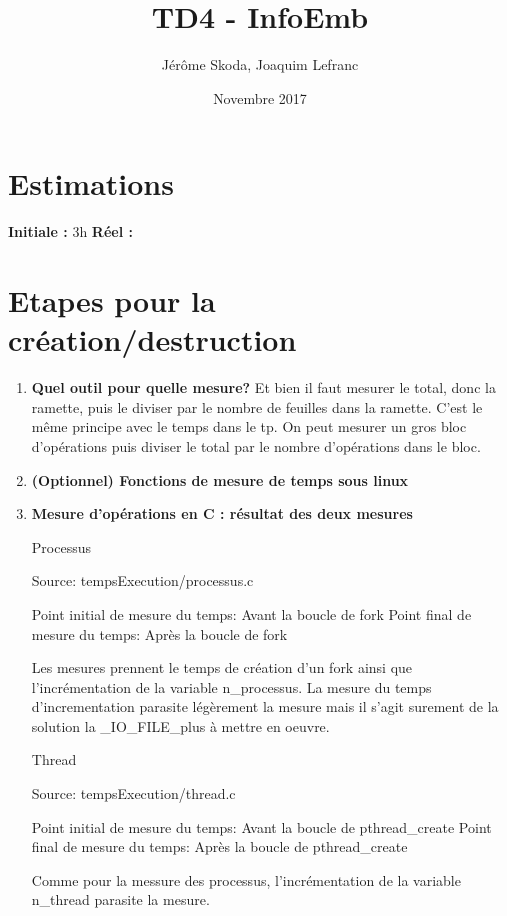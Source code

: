 \documentclass[12pt]{article}
\title{TD4 - InfoEmb}
\author{Jérôme Skoda, Joaquim Lefranc}
\date{Novembre 2017}
\begin{document}
\maketitle

\section{Estimations}
\textbf{Initiale :} 3h
\textbf{Réel :}

\section{Etapes pour la création/destruction}
\begin{enumerate}
	\item{\textbf{Quel outil pour quelle mesure?}}
		\newline
		Et bien il faut mesurer le total, donc la ramette, puis le diviser par le nombre de feuilles dans la ramette. C'est le même principe avec le temps dans le tp. On peut mesurer un gros bloc d'opérations puis diviser le total par le nombre d'opérations dans le bloc.
		\newline

	\item{\textbf{(Optionnel) Fonctions de mesure de temps sous linux}}
		\newline

	\item{\textbf{Mesure d'opérations en C : résultat des deux mesures}}
		\newline

		Processus

		Source: tempsExecution/processus.c

		Point initial de mesure du temps: Avant la boucle de fork
		Point final de mesure du temps: Après la boucle de fork

    Les mesures prennent le temps de création d'un fork ainsi que l'incrémentation
	  de la variable n_processus. La mesure du temps d'incrementation parasite
		légèrement la mesure mais il s'agit surement de la solution la _IO_FILE_plus
		à mettre en oeuvre.

    Thread

		Source: tempsExecution/thread.c

    Point initial de mesure du temps: Avant la boucle de pthread_create
		Point final de mesure du temps: Après la boucle de pthread_create

    Comme pour la messure des processus, l'incrémentation de la variable
		n_thread parasite la mesure.



\end{enumerate}
\end{document}
